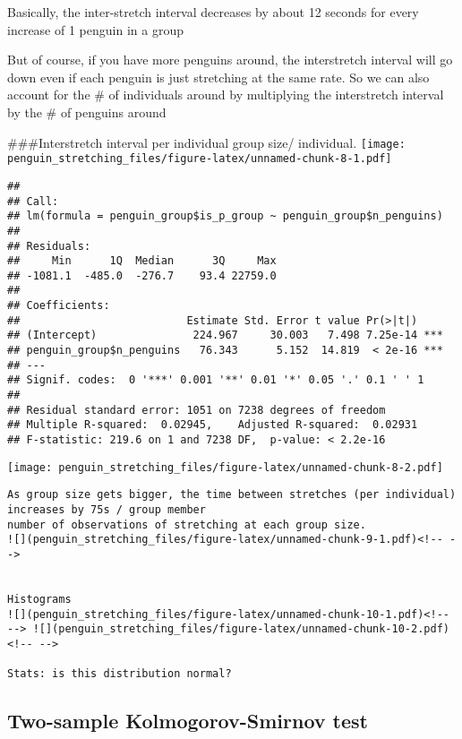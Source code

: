 \documentclass[]{article}
\begin{document}
Basically, the inter-stretch interval decreases by about 12 seconds for
every increase of 1 penguin in a group

But of course, if you have more penguins around, the interstretch
interval will go down even if each penguin is just stretching at the
same rate. So we can also account for the \# of individuals around by
multiplying the interstretch interval by the \# of penguins around

\#\#\#Interstretch interval per individual group size/ individual.
\texttt{[image: penguin\_stretching\_files/figure-latex/unnamed-chunk-8-1.pdf]}

\begin{verbatim}
## 
## Call:
## lm(formula = penguin_group$is_p_group ~ penguin_group$n_penguins)
## 
## Residuals:
##     Min      1Q  Median      3Q     Max 
## -1081.1  -485.0  -276.7    93.4 22759.0 
## 
## Coefficients:
##                          Estimate Std. Error t value Pr(>|t|)    
## (Intercept)               224.967     30.003   7.498 7.25e-14 ***
## penguin_group$n_penguins   76.343      5.152  14.819  < 2e-16 ***
## ---
## Signif. codes:  0 '***' 0.001 '**' 0.01 '*' 0.05 '.' 0.1 ' ' 1
## 
## Residual standard error: 1051 on 7238 degrees of freedom
## Multiple R-squared:  0.02945,    Adjusted R-squared:  0.02931 
## F-statistic: 219.6 on 1 and 7238 DF,  p-value: < 2.2e-16
\end{verbatim}

\texttt{[image: penguin\_stretching\_files/figure-latex/unnamed-chunk-8-2.pdf]}

\begin{verbatim}
As group size gets bigger, the time between stretches (per individual) increases by 75s / group member
number of observations of stretching at each group size. 
![](penguin_stretching_files/figure-latex/unnamed-chunk-9-1.pdf)<!-- --> 


Histograms 
![](penguin_stretching_files/figure-latex/unnamed-chunk-10-1.pdf)<!-- --> ![](penguin_stretching_files/figure-latex/unnamed-chunk-10-2.pdf)<!-- --> 

Stats: is this distribution normal?
\end{verbatim}

\hypertarget{section}{%
\subsection{}\label{section}}

\hypertarget{two-sample-kolmogorov-smirnov-test}{%
\subsection{Two-sample Kolmogorov-Smirnov
test}\label{two-sample-kolmogorov-smirnov-test}}
\end{document}
